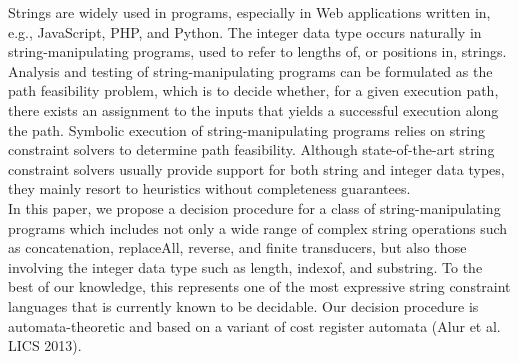 
Strings are widely used in programs, especially in Web applications written in, e.g., JavaScript, PHP, and Python. The integer data type occurs naturally in string-manipulating programs, used to refer to lengths of, or positions in, strings. 
Analysis and testing of string-manipulating programs can be formulated as the path feasibility problem, which is to decide whether,  
for a given execution path, there exists an assignment to the inputs that yields a successful execution along the path. 
Symbolic execution of string-manipulating programs relies on string constraint solvers to determine  path feasibility.
Although state-of-the-art string constraint solvers usually provide support for both string and integer data types,   
they mainly resort to heuristics without completeness guarantees. \\ %
%
In this paper, we propose a decision procedure 
for a class of string-manipulating programs
which includes  not only a wide range of complex string operations such as concatenation, replaceAll, reverse, and finite transducers, but also those involving the integer data type such as length, indexof, and substring. To the best of our knowledge, this represents one of the most expressive string constraint languages that is currently known to be decidable.  Our decision procedure is automata-theoretic and based on a variant of cost register automata (Alur et al. LICS 2013). 
